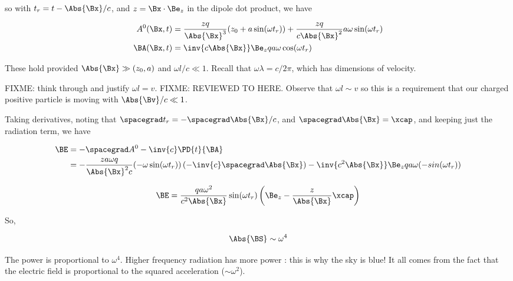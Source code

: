 so with $t_r = t - \Abs{\Bx}/c$, and $z = \Bx \cdot \Be_z$ in the dipole dot product, we have

\begin{align}\label{eqn:relativisticElectrodynamicsL20:400}
A^0(\Bx, t) &= 
\frac{z q}{\Abs{\Bx}^3} ( z_0 + a \sin(\omega t_r) ) + \frac{z q}{c \Abs{\Bx}^2} a \omega \sin(\omega t_r) \\
\BA(\Bx, t) &= \inv{c \Abs{\Bx}} \Be_z q a \omega \cos(\omega t_r)
\end{align}

These hold provided $\Abs{\Bx} \gg (z_0, a)$ and $\omega l/c \ll 1$.  Recall that $\omega \lambda = c/2\pi$, which has dimensions of velocity.

FIXME: think through and justify $\omega l = v$.
FIXME: REVIEWED TO HERE.
Observe that $\omega l \sim v$ so this is a requirement that our charged positive particle is moving with $\Abs{\Bv}/c \ll 1$.

Taking derivatives, noting that $\spacegrad t_r = -\spacegrad \Abs{\Bx}/c$, and $\spacegrad \Abs{\Bx} = \xcap$, and keeping just the radiation term, we have

\begin{align*}
\BE 
&= -\spacegrad A^0 - \inv{c} \PD{t}{\BA} \\
&= -\frac{z a \omega q}{\Abs{\Bx}^2 c} (-\omega \sin(\omega t_r)) \left( - \inv{c} \spacegrad \Abs{\Bx} \right)
- \inv{c^2 \Abs{\Bx}} \Be_z q a \omega (-sin(\omega t_r))
\end{align*}

\begin{equation}\label{eqn:relativisticElectrodynamicsL20:420}
\BE = \frac{ q a \omega^2 }{c^2 \Abs{\Bx}} \sin(\omega t_r) \left( \Be_z - \frac{z}{\Abs{\Bx}} \xcap \right)
\end{equation}

So,

\begin{equation}\label{eqn:relativisticElectrodynamicsL20:440}
\Abs{\BS} \sim \omega^4
\end{equation}

The power is proportional to $\omega^4$.  Higher frequency radiation has more power : this is why the sky is blue!  It all comes from the fact that the electric field is proportional to the squared acceleration ($\sim \omega^2$).

\EndArticle
